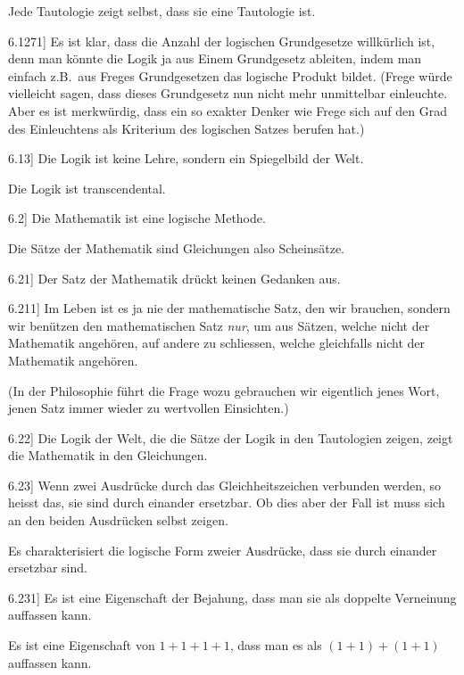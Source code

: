 \documentclass[12pt,oneside]{book}[2007/10/19]
\newcommand{\PropERef}[1]{\hyperref[PropE:#1]{#1}}
\newcommand{\PropositionG}[2]{%
  \item[\phantomsection\label{PropG:#1}\PropERef{#1}] #2%
}
\newcommand{\Emph}[1]{\emph{#1}}%
\newcommand{\zumBeispiel}{z.\;B.}
\begin{document}
\begin{propositions}
{Jede Tautologie zeigt selbst, dass sie eine
Tautologie ist.}


\PropositionG{6.1271}
{Es ist klar, dass die Anzahl der \glqq{}logischen
Grundgesetze\grqq{} willkürlich ist, denn man könnte
die Logik ja aus Einem Grundgesetz ableiten,
indem man einfach \zumBeispiel\ aus Freges Grundgesetzen
das logische Produkt bildet. (Frege würde
vielleicht sagen, dass dieses Grundgesetz nun
nicht mehr unmittelbar einleuchte. Aber es ist
merkwürdig, dass ein so exakter Denker wie
Frege sich auf den Grad des Einleuchtens als
Kriterium des logischen Satzes berufen hat.)}


\PropositionG{6.13}
{Die Logik ist keine Lehre, sondern ein Spiegelbild
der Welt.

Die Logik ist transcendental.}


\PropositionG{6.2}
{Die Mathematik ist eine logische Methode.

Die Sätze der Mathematik sind Gleichungen
also Scheinsätze.}


\PropositionG{6.21}
{Der Satz der Mathematik drückt keinen Gedanken
aus.}


\PropositionG{6.211}
{Im Leben ist es ja nie der mathematische Satz,
den wir brauchen, sondern wir benützen den
mathematischen Satz \Emph{nur}, um aus Sätzen, welche
nicht der Mathematik angehören, auf andere zu
schliessen, welche gleichfalls nicht der Mathematik
angehören.

(In der Philosophie führt die Frage \glqq{}wozu
gebrauchen wir eigentlich jenes Wort, jenen Satz\grqq{}
immer wieder zu wertvollen Einsichten.)}


\PropositionG{6.22}
{Die Logik der Welt, die die Sätze der Logik in
den Tautologien zeigen, zeigt die Mathematik in
den Gleichungen.}


\PropositionG{6.23}
{Wenn zwei Ausdrücke durch das Gleichheitszeichen
verbunden werden, so heisst das, sie sind
durch einander ersetzbar. Ob dies aber der Fall ist
muss sich an den beiden Ausdrücken selbst zeigen.

Es charakterisiert die logische Form zweier Ausdrücke,
dass sie durch einander ersetzbar sind.}


\PropositionG{6.231}
{Es ist eine Eigenschaft der Bejahung, dass man
sie als doppelte Verneinung auffassen kann.

Es ist eine Eigenschaft von \glqq{}$1 + 1 + 1 + 1$\grqq{}, dass
man es als \glqq{}$(1 + 1) + (1 + 1)$\grqq{} auffassen kann.}



\end{propositions}
\end{document}

